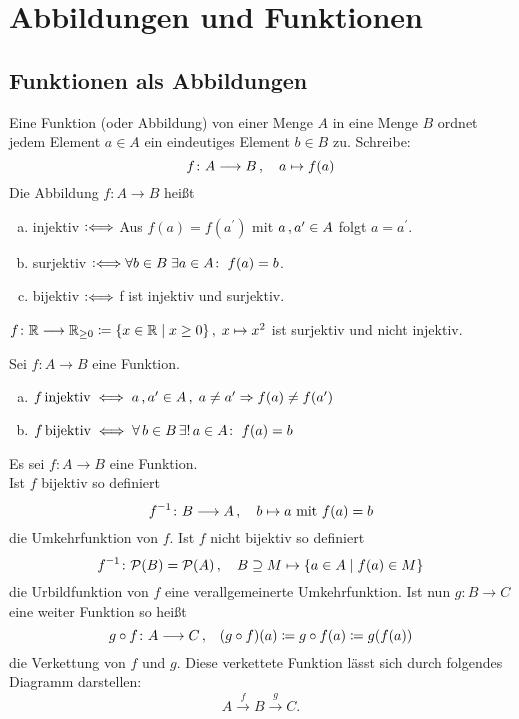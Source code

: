 \documentclass[../ana1.tex]{subfiles}
\begin{document}
\setcounter{section}{3}

\section{Abbildungen und Funktionen}

\subsection{Funktionen als Abbildungen}

\begin{defi}
	Eine Funktion (oder Abbildung) von einer Menge \(A\) in eine Menge \(B\) ordnet jedem Element \(a \in A\)
	ein eindeutiges Element \(b \in B\) zu. Schreibe:
	\[f \colon A \longrightarrow B \operatorname{,} \quad a \mapsto f(a)\]
	Die Abbildung \(f \colon A \longrightarrow B\) heißt
	\begin{enumerate}[(a)]
		\item injektiv \(\mathrel{\vcentcolon\Longleftrightarrow}\) Aus \(f(a) = f(a^\prime)\) mit \(a \operatorname{,} a^\prime \in A\) folgt \(a = a^\prime\).
		\item surjektiv \(\mathrel{\vcentcolon\Longleftrightarrow} \forall b \in B \; \exists a \in A \colon \; f(a) = b\).
		\item bijektiv \(\mathrel{\vcentcolon\Longleftrightarrow}\) f ist injektiv und surjektiv. 
	\end{enumerate}
\end{defi}

\begin{bsp}
	\(f \colon \mathbb{R} \longrightarrow \mathbb{R}_{\geq 0} \coloneqq \{x \in \mathbb{R} \; \vert \; x \geq 0\} \operatorname{,} \; x \mapsto x^{2}\) ist surjektiv und nicht injektiv.
\end{bsp}

\begin{bem}
	Sei \(f \colon A \longrightarrow B\) eine Funktion.
	\begin{enumerate}[(a)]
		\item \(f \operatorname{injektiv} \iff a \operatorname{,} a^\prime \in A \operatorname{,} \; a \neq a^\prime \Rightarrow f(a) \neq f(a^\prime)\)
		\item \(f \operatorname{bijektiv} \iff \forall \, b \in B \, \exists! \,a \in A \colon \; f(a) = b\)
	\end{enumerate}
\end{bem}

\begin{defi*}
	Es sei \(f \colon A \longrightarrow B\) eine Funktion.\\
	Ist \(f\) bijektiv so definiert
	\[\inverse{f} \colon B \longrightarrow A \ko \quad b \mapsto a \text{ mit } f(a) = b\]
	die Umkehrfunktion von \(f\).
	Ist \(f\) nicht bijektiv so definiert
	\[\inverse{f} \colon \PO(B) = \PO(A) \ko \quad B \supseteq M \mapsto \set{a \in A \; \vert \; f(a) \in M}\]
	die Urbildfunktion von \(f\) eine verallgemeinerte Umkehrfunktion.
	Ist nun \(g \colon B \longrightarrow C\) eine weiter Funktion so heißt
	\[g \circ f \colon A \longrightarrow C \operatorname{,} \quad (g \circ f)(a) \coloneqq g \circ f(a) \coloneqq g(f(a))\]
	die Verkettung von \(f\) und \(g\). Diese verkettete Funktion lässt sich durch folgendes Diagramm darstellen:
	\[A \overset{f}{\longrightarrow} B \overset{g}{\longrightarrow} C.\]
\end{defi*}
\end{document}
